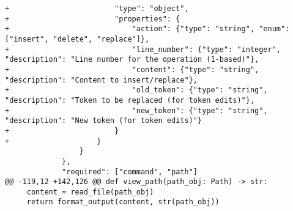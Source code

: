 \begin{lstlisting}[style=diffstyle]
+                        "type": "object",
+                        "properties": {
+                            "action": {"type": "string", "enum": ["insert", "delete", "replace"]},
+                            "line_number": {"type": "integer", "description": "Line number for the operation (1-based)"},
+                            "content": {"type": "string", "description": "Content to insert/replace"},
+                            "old_token": {"type": "string", "description": "Token to be replaced (for token edits)"},
+                            "new_token": {"type": "string", "description": "New token (for token edits)"}
+                        }
+                    }
                 }
             },
             "required": ["command", "path"]
@@ -119,12 +142,126 @@ def view_path(path_obj: Path) -> str:
     content = read_file(path_obj)
     return format_output(content, str(path_obj))
 

\end{lstlisting}
